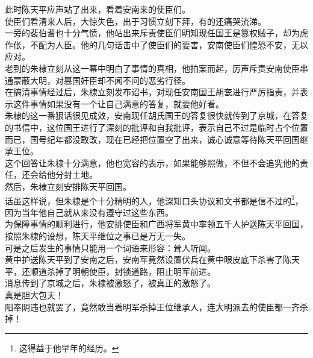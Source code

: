 \begin{multicols}{\theparacolNo}
此时陈天平应声站了出来，看着安南来的使臣们。\\

使臣们看清来人后，大惊失色，出于习惯立刻下拜，有的还痛哭流涕。\\

一旁的裴伯耆也十分气愤，他站出来斥责使臣们明知现任国王是篡权贼子，却为虎作伥，不配为人臣。他的几句话击中了使臣们的要害，安南使臣们惶恐不安，无以应对。\\

老到的朱棣立刻从这一幕中明白了事情的真相，他拍案而起，厉声斥责安南使臣串通蒙蔽大明，对篡国奸臣却不闻不问的恶劣行径。\\

在搞清事情经过后，朱棣立刻发布诏书，对现任安南国王胡奃进行严厉指责，并表示这件事情如果没有一个让自己满意的答复，就要他好看。\\

朱棣的这一番狠话很见成效，安南现任胡氏国王的答复很快就传到了京城，在答复的书信中，这位国王进行了深刻的批评和自我批评，表示自己不过是临时占个位置而已，国号纪年都没敢改，现在已经把位置空了出来，诚心诚意等待陈天平回国继承王位。\\

这个回答让朱棣十分满意，他也宽容的表示，如果能够照做，不但不会追究他的责任，还会给他分封土地。\\

然后，朱棣立刻安排陈天平回国。\\

话虽这样说，但朱棣是个十分精明的人，他深知口头协议和文书都是信不过的\footnote{这得益于他早年的经历。}，因为当年他自己就从来没有遵守过这些东西。\\

为保障事情的顺利进行，他安排使臣和广西将军黄中率领五千人护送陈天平回国，按照朱棣的设想，陈天平继位之事已是万无一失。\\

可是之后发生的事情只能用一个词语来形容：耸人听闻。\\

黄中护送陈天平到了安南之后，安南军竟然设置伏兵在黄中眼皮底下杀害了陈天平，还顺道杀掉了明朝使臣，封锁道路，阻止明军前进。\\

消息传到了京城之后，朱棣被激怒了，被真正的激怒了。\\

真是胆大包天！\\

阳奉阴违也就罢了，竟然敢当着明军杀掉王位继承人，连大明派去的使臣都一齐杀掉！\\


\end{multicols}

